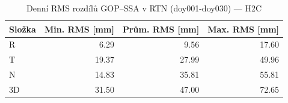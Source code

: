 \begin{table}[H]
\centering
\caption{Denní RMS rozdílů GOP–SSA v RTN (doy001-doy030) — H2C}
\label{tab:gop_vs_ssa_h2c_doy001-doy030_rms}
\begin{tabular}{lrrr}
\toprule
Složka & Min. RMS [mm] & Prům. RMS [mm] & Max. RMS [mm] \\
\midrule
R & 6.29 & 9.56 & 17.60 \\
T & 19.37 & 27.99 & 49.96 \\
N & 14.83 & 35.81 & 55.81 \\
3D & 31.50 & 47.00 & 72.65 \\
\bottomrule
\end{tabular}
\end{table}
